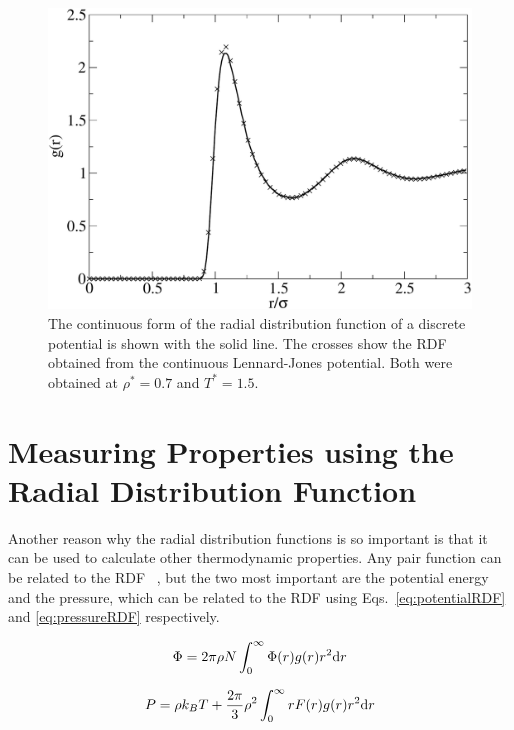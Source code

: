 \documentclass[12pt]{UoAthesis} \usepackage{booktabs}
\begin{document}
\begin{figure}[htp] 
  \begin{center}
    \includegraphics[clip,scale=0.45]{figures/rdfcomp} 
    \caption[Continuous conversion of a discrete radial distribution
    function]
    {\label{fig:rdfcomp} The continuous form of the radial
      distribution function of a discrete potential is shown with the
      solid line.  The crosses show the RDF obtained from the
      continuous Lennard-Jones potential.  Both were obtained at
      $\rho^*=0.7$ and $T^* = 1.5$.}
  \end{center}
\end{figure}

\section{Measuring Properties using the Radial Distribution Function}
\label{sec:RDFMeasure}
Another reason why the radial distribution functions is so important
is that it can be used to calculate other thermodynamic properties.
Any pair function can be related to the RDF ~\cite{Allen1987}, but the
two most important are the potential energy and the pressure, which
can be related to the RDF using Eqs.~\eqref{eq:potentialRDF} and
\eqref{eq:pressureRDF} respectively.

\begin{equation}
  \label{eq:potentialRDF}
  \Phi = 2 \pi \rho N \int^\infty_0 \Phi(r)g(r)r^2 {\rm d}r
\end{equation}

\begin{equation}
  \label{eq:pressureRDF}
  P = \rho k_BT + \frac{2\pi}{3}\rho^2 \int^\infty_0rF(r)g(r)r^2 {\rm d}r
\end{equation}
\end{document}
